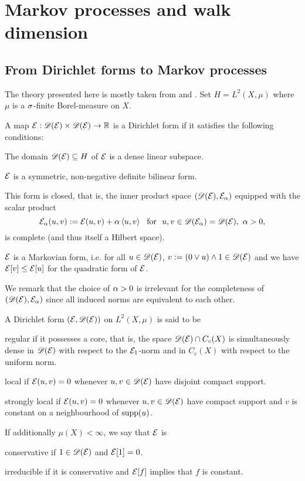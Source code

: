 \section{Markov processes and walk dimension}

\subsection{From Dirichlet forms to Markov processes}

The theory presented here is mostly taken from \cite{fukushima2011dirichlet} and \cite[ch. 4]{ma2012introduction}. Set $H=L^2(X,\mu)$ where $\mu$ is a $\sigma$-finite Borel-measure on $X$. 
\begin{defin}\label{defin:DF}
  A map $\mathcal{E}:\mathscr{D}(\mathcal{E})\times\mathscr{D}(\mathcal{E})\to\mathbb{R}$ is a Dirichlet form if it satisfies the following conditions:
  \begin{compactenum}[i.]
  \item The domain $\mathscr{D}(\mathcal{E})\subseteq H$ of $\mathcal{E}$ is a dense linear subspace.
  \item $\mathcal{E}$ is a symmetric, non-negative definite bilinear form.
  \item This form is closed, that is, the inner product space $(\mathscr{D}(\mathcal{E}),\mathcal{E}_\alpha)$ equipped with the scalar product
  \[
    \cE_\ga(u,v):=\cE(u,v)+\ga\left<u,v\right>\ \text{ for }\ u,v\in\scD(\cE_\ga)=\scD(\cE),\ \ga>0,
  \]
  is complete (and thus itself a Hilbert space).
  \item $\mathcal{E}$ is a Markovian form, i.e. for all $u\in\mathscr{D}(\mathcal{E})$, $v:=(0\vee u)\wedge 1\in\mathscr{D}(\mathcal{E})$ and we have $\mathcal{E}[v]\leq\mathcal{E}[u]$ for the quadratic form of $\mathcal{E}$. 
  \end{compactenum}
\end{defin}
We remark that the choice of $\alpha>0$ is irrelevant for the completeness of $(\mathscr{D}(\mathcal{E}),\mathcal{E}_\alpha)$ since all induced norms are equivalent to each other. 
\begin{defin}
  A Dirichlet form $(\mathcal{E},\mathscr{D}(\mathcal{E}))$ on $L^2(X,\mu)$ is said to be
  \begin{compactenum}[i.]
    \item regular if it possesses a core, that is, the space $\mathscr{D}(\mathcal{E})\cap C_c(X)$ is simultaneously dense in $\mathscr{D}(\mathcal{E})$ with respect to the $\mathcal{E}_1$-norm and in $C_c(X)$ with respect to the uniform norm. 
    \item local if $\mathcal{E}(u,v)=0$ whenever $u,v\in\mathscr{D}(\mathcal{E})$ have disjoint compact support.
    \item strongly local if $\mathcal{E}(u,v)=0$ whenever $u,v\in\mathscr{D}(\mathcal{E})$ have compact support and $v$ is constant on a neighbourhood of $\operatorname{supp}(u)$.
  \end{compactenum}
  If additionally $\mu(X)<\infty$, we say that $\mathcal{E}$ is
  \begin{compactenum}[i.]
    \setcounter{enumi}{3}
    \item conservative if $1\in\mathscr{D}(\mathcal{E})$ and $\mathcal{E}[1]=0$.
    \item irreducible if it is conservative and $\mathcal{E}[f]$ implies that $f$ is constant. 
  \end{compactenum}
\end{defin}
